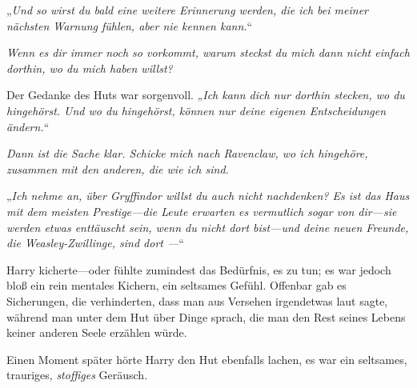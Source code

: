 „\emph{Und so wirst du bald eine weitere Erinnerung werden, die ich bei meiner nächsten Warnung fühlen, aber nie kennen kann.}“

\emph{Wenn es dir immer noch so vorkommt, warum steckst du mich dann nicht einfach dorthin, wo du mich haben willst?}

Der Gedanke des Huts war sorgenvoll. „\emph{Ich kann dich nur dorthin stecken, wo du hingehörst. Und wo du hingehörst, können nur deine eigenen Entscheidungen ändern.}“

\emph{Dann ist die Sache klar. Schicke mich nach Ravenclaw, wo ich hingehöre, zusammen mit den anderen, die wie ich sind. }

„\emph{Ich nehme an, über Gryffindor willst du auch nicht nachdenken? Es ist das Haus mit dem meisten Prestige—die Leute erwarten es vermutlich sogar von dir—sie werden etwas enttäuscht sein, wenn du nicht dort bist—und deine neuen Freunde, die Weasley-Zwillinge, sind dort —}“

Harry kicherte—oder fühlte zumindest das Bedürfnis, es zu tun; es war jedoch bloß ein rein mentales Kichern, ein seltsames Gefühl. Offenbar gab es Sicherungen, die verhinderten, dass man aus Versehen irgendetwas laut sagte, während man unter dem Hut über Dinge sprach, die man den Rest seines Lebens keiner anderen Seele erzählen würde.

Einen Moment später hörte Harry den Hut ebenfalls lachen, es war ein seltsames, trauriges, \emph{stoffiges} Geräusch.

